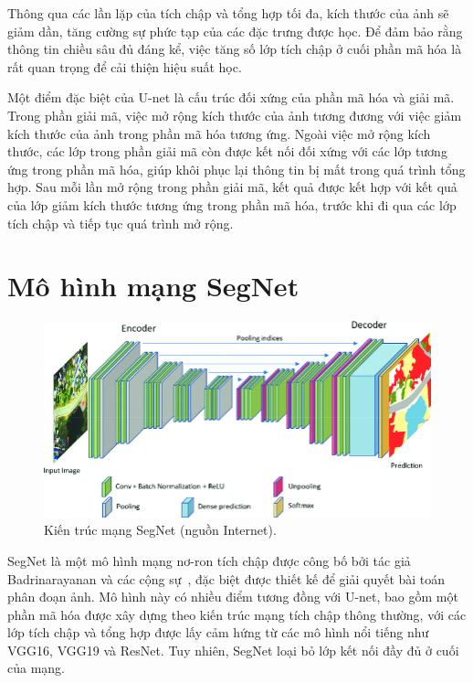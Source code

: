 Thông qua các lần lặp của tích chập và tổng hợp tối đa, kích thước của ảnh sẽ giảm dần, tăng cường sự phức tạp của các đặc trưng được học. Để đảm bảo rằng thông tin chiều sâu đủ đáng kể, việc tăng số lớp tích chập ở cuối phần mã hóa là rất quan trọng để cải thiện hiệu suất học.

Một điểm đặc biệt của U-net là cấu trúc đối xứng của phần mã hóa và giải mã. Trong phần giải mã, việc mở rộng kích thước của ảnh tương đương với việc giảm kích thước của ảnh trong phần mã hóa tương ứng. Ngoài việc mở rộng kích thước, các lớp trong phần giải mã còn được kết nối đối xứng với các lớp tương ứng trong phần mã hóa, giúp khôi phục lại thông tin bị mất trong quá trình tổng hợp. Sau mỗi lần mở rộng trong phần giải mã, kết quả được kết hợp với kết quả của lớp giảm kích thước tương ứng trong phần mã hóa, trước khi đi qua các lớp tích chập và tiếp tục quá trình mở rộng.

\section{Mô hình mạng SegNet}

\begin{figure}[h]
	\centering
	\includegraphics[width=120mm]{fig/SegNet-architecture.png}
        \captionsetup{justification=centering}
	\caption{Kiến trúc mạng SegNet (nguồn Internet).}
	\label{fig_SegNet}
\end{figure}

SegNet là một mô hình mạng nơ-ron tích chập được công bố bởi tác giả Badrinarayanan và các cộng sự~\cite{badrinarayanan2017segnet}, đặc biệt được thiết kế để giải quyết bài toán phân đoạn ảnh. Mô hình này có nhiều điểm tương đồng với U-net, bao gồm một phần mã hóa được xây dựng theo kiến trúc mạng tích chập thông thường, với các lớp tích chập và tổng hợp được lấy cảm hứng từ các mô hình nổi tiếng như VGG16, VGG19 và ResNet. Tuy nhiên, SegNet loại bỏ lớp kết nối đầy đủ ở cuối của mạng.

